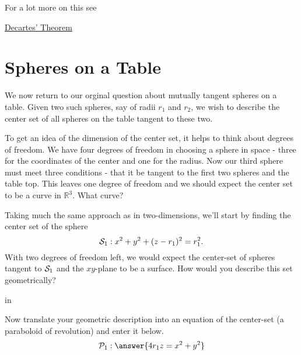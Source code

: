 \documentclass{ximera}
\newcommand{\pskip}{\vskip 0.1 in}
\begin{document}
For a lot more on this see

\href{https://en.wikipedia.org/wiki/Descartes%27_theorem}{Decartes' Theorem}


\section{Spheres on a Table}
We now return to our orginal question about mutually tangent spheres on a table. Given two such spheres, say of radii $r_1$ and $r_2$, we wish to describe the center set of all spheres on the table tangent to these two. 

To get an idea of the dimension of the center set, it helps to think about degrees of freedom. We have four degrees of freedom in choosing a sphere in space - three for the coordinates of the center and one for the radius. Now our third sphere must meet three conditions - that it be tangent to the first two spheres and the table top. This leaves one degree of freedom and we should expect the center set to be a curve in $\mathbb{R}^3$. What curve?



\begin{question}    \label{Q23423:Spheres}
  
Taking much the same approach as in two-dimensions, we'll start by finding the center set of the sphere %
\[
      {\cal S}_1:    x^2 + y^2 + (z-r_1)^2 = r_1^2 .
\]
With two degrees of freedom left, we would expect the center-set of spheres tangent to ${\cal S}_1$ and the $xy$-plane to be a surface. How would you describe this set geometrically?
 
  \begin{selectAll}  
  \end{selectAll}  

\pskip

Now translate your geometric description into an equation of the center-set (a paraboloid of revolution) and enter it below.
\[
   {\cal P}_1:  \answer{4 r_1z  = x^2 + y^2}
\]
\end{question}
\end{document}
